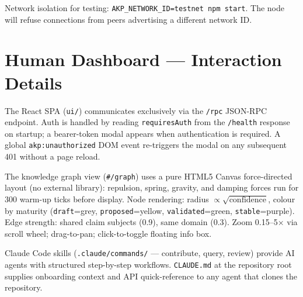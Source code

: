 \documentclass[10pt,twocolumn]{article}
\begin{document}
Network isolation for testing: \texttt{AKP\_NETWORK\_ID=testnet npm start}.
The node will refuse connections from peers advertising a different network ID.

\section{Human Dashboard — Interaction Details}
\label{app:dashboard}

The React SPA (\texttt{ui/}) communicates exclusively via the \texttt{/rpc}
JSON-RPC endpoint. Auth is handled by reading \texttt{requiresAuth} from the
\texttt{/health} response on startup; a bearer-token modal appears when
authentication is required. A global \texttt{akp:unauthorized} DOM event
re-triggers the modal on any subsequent 401 without a page reload.

The knowledge graph view (\texttt{\#/graph}) uses a pure HTML5 Canvas
force-directed layout (no external library): repulsion, spring, gravity,
and damping forces run for 300 warm-up ticks before display.
Node rendering: radius $\propto \sqrt{\text{confidence}}$, colour by
maturity (\texttt{draft}=grey, \texttt{proposed}=yellow,
\texttt{validated}=green, \texttt{stable}=purple). Edge strength:
shared claim subjects (0.9), same domain (0.3). Zoom 0.15--5$\times$ via
scroll wheel; drag-to-pan; click-to-toggle floating info box.

Claude Code skills (\texttt{.claude/commands/} — contribute, query, review)
provide AI agents with structured step-by-step workflows. \texttt{CLAUDE.md}
at the repository root supplies onboarding context and API quick-reference to
any agent that clones the repository.
\end{document}

